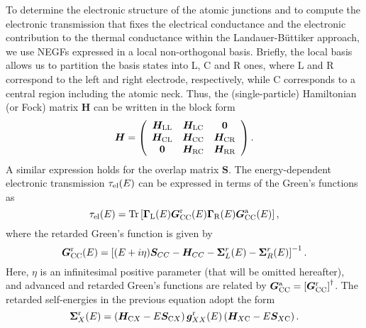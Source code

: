 \documentclass[aps,amsmath,amssymb,twocolumn,showpacs]{revtex4-1}
\begin{document}
To determine the electronic structure of the atomic junctions
and to compute the electronic transmission that fixes the electrical
conductance and the electronic contribution to the thermal conductance
within the Landauer-B\"uttiker approach, we use NEGFs expressed in a local
non-orthogonal basis. Briefly, the local basis allows us to partition the
basis states into L, C and R ones, where L and R correspond to the left and
right electrode, respectively, while C corresponds to a central region
including the atomic neck. Thus, the (single-particle) Hamiltonian (or Fock)
matrix $\boldsymbol H$ can be written in the block form
%
\begin{equation}
{\boldsymbol H} = \left(\begin{array}{ccc}
{\boldsymbol H}_{\rm LL} & {\boldsymbol H}_{\rm LC} & {\boldsymbol 0}\\ {\boldsymbol H}_{\rm CL} & 
{\boldsymbol H}_{\rm CC} & {\boldsymbol H}_{\rm CR}\\ {\boldsymbol 0} & {\boldsymbol H}_{\rm RC} & 
{\boldsymbol H}_{\rm RR} \end{array}\right).
\label{eq-H}
\end{equation}
%
A similar expression holds for the overlap matrix $\boldsymbol S$. The
energy-dependent electronic transmission $\tau_{\rm el}(E)$ can be expressed
in terms of the Green's functions as \cite{Cuevas2017}
%
\begin{equation}
\tau_{\rm el}(E) = \mathrm{Tr} \left[{\boldsymbol \Gamma}_{\rm L}(E) {\boldsymbol G}_{\rm CC}^{\rm r}(E) 
{\boldsymbol \Gamma}_{\rm R}(E) {\boldsymbol G}_{\rm CC}^{\rm a}(E) \right],
\label{eq-tau-el}
\end{equation}
%
where the retarded Green's function is given by
%
\begin{equation}
{\boldsymbol G}_{\rm CC}^{\rm r}(E) = \left[ (E+i\eta) {\boldsymbol S}_{CC} - {\boldsymbol H}_{CC} - 
{\boldsymbol \Sigma}_{L}^{r}(E) - {\boldsymbol \Sigma}_{R}^{r}(E)\right]^{-1} .
\label{eq-GCC}
\end{equation}
%
Here, $\eta$ is an infinitesimal positive parameter (that will be omitted
hereafter), and advanced and retarded Green's functions are related by
${\boldsymbol G}_{\rm CC}^{\rm a} = \left[{\boldsymbol G}_{\rm CC}^{\rm
    r}\right]^{\dagger}$. The retarded self-energies in the previous equation
adopt the form
%
\begin{equation}
{\boldsymbol \Sigma}_{X}^{\rm r}(E) = \left({\boldsymbol H}_{{\rm C}X} - E {\boldsymbol S}_{{\rm C}X} 
\right) {\boldsymbol g}_{XX}^{\rm r}(E) \left({\boldsymbol H}_{X{\rm C}} - E {\boldsymbol S}_{X{\rm C}} 
\right).
\label{eq-SigmaX}
\end{equation}
\end{document}
